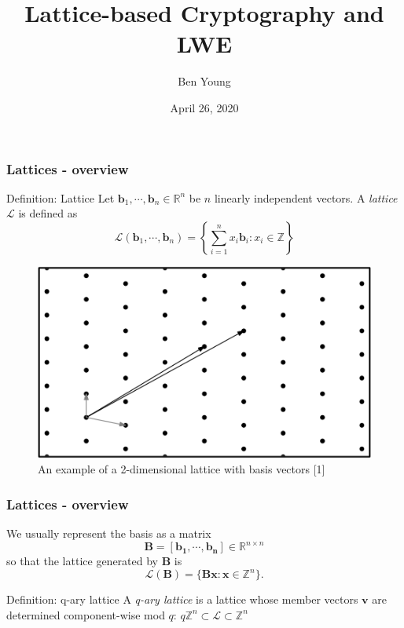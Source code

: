 \documentclass{beamer}
\title{Lattice-based Cryptography and LWE}
\author{Ben Young}
\institute{MATH 408}
\date{April 26, 2020}
\renewcommand{\v}{\mathbf}
\begin{document}
\frame{\titlepage}

\begin{frame}
\frametitle{Lattices - overview}
\begin{block}{Definition: Lattice}
    Let $\v{b}_1,\cdots,\v{b}_n \in \mathbb{R}^n$ be $n$ linearly independent vectors. 
    A \textit{lattice} $\mathcal{L}$ is defined as
\begin{equation*}
    \mathcal{L}(\v{b}_1,\cdots,\v{b}_n) = \left\{\sum_{i=1}^n{x_i\v{b}_i : x_i \in \mathbb{Z}}\right\}
\end{equation*}
\end{block}
\begin{figure}[h!]
    \caption{An example of a 2-dimensional lattice with basis vectors [1]}
    \centering
    \includegraphics[scale=0.3]{lattice.png}
\end{figure}
\end{frame}

\begin{frame}
\frametitle{Lattices - overview}
We usually represent the basis as a matrix 
\begin{equation*}
    \v{B} = [\v{b_1}, \cdots, \v{b_n}] \in \mathbb{R}^{n \times n}
\end{equation*}
so that the lattice generated by $\v{B}$ is
\begin{equation*}
    \mathcal{L}(\v{B}) = \{\v{Bx}: \v{x} \in \mathbb{Z}^n\}.
\end{equation*}
\begin{block}{Definition: q-ary lattice}
A \textit{q-ary lattice} is a lattice whose
member vectors $\v{v}$ are determined component-wise mod $q$:
$q\mathbb{Z}^n \subset \mathcal{L} \subset \mathbb{Z}^n$
\end{block}
\end{frame}
\end{document}
